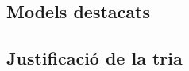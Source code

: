 \begin{comment}
QA:
# deepset/roberta-large-squad2: blocking of the malicious portal
# deepset/deberta-v3-large-squad2: deletion of the emails that have arrived in the mailboxes
# gpt2-large: caca
# bart: not usable
# kaist-ai/prometheus-7b-v1.0 (hi ha una versió de 11b) no funciona, massa gran
# deepset/bert-large-uncased-whole-word-masking-squad2: blocking of the malicious portal
# bert-large-uncased-whole-word-masking-finetuned-squad: blocking of the malicious portal
# botcon/squad_tuned_luke_peft_full: blocking of the malicious portal
# jkgrad/xlnet-base-squadv2: caca
# deepakvk/xlnet-base-cased-squad2: caca
# saburbutt/xlnet_large_tweetqa: caca

Text Generation:
# gpt2-large: caca
# bart: not usable
# kaist-ai/prometheus-7b-v1.0 (hi ha una versió de 11b) no funciona, massa gran
# HiTZ/GoLLIE-7B: massa gran
# xlnet-large-cased: caca
# EleutherAI/gpt-j-6B: massa gran
# mistralai/Mistral-7B-v0.1: funciona a la web pero es massa gran en local
# HuggingFaceH4/zephyr-7b-alpha: massa gran
# EleutherAI/gpt-neo-2.7B: entèn el significat però el format de sortida és massa boig i comença a divagar

T2T Generation:
# google/flan-t5-large (hi ha versions encara més grans) text2text-generation: deletion of the emails that have arrived in the mailboxes of scope users and the blocking of the malicious portal
# facebook/m2m100_418M: no aplicable, serveix per traduir
# valhalla/t5-base-qa-qg-hl phishing campaign emails
# mohitsha/tiny-random-testing-bert2gpt2: when when when when when when when when when when when when when when when when
\end{comment}


\subsection{Models destacats}
\subsection{Justificació de la tria}